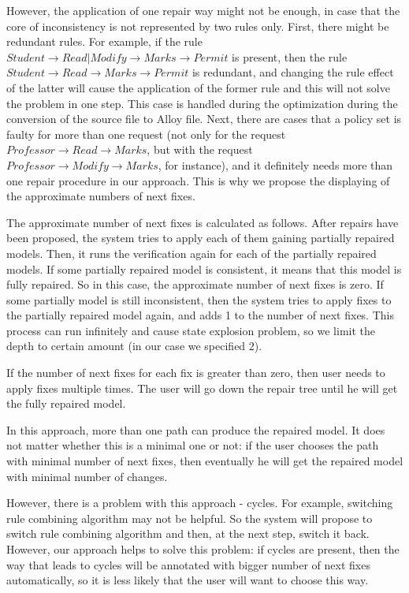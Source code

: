 \documentclass{acm_proc_article-sp}
\begin{document}
However, the application of one repair way might not be enough, in case that the core of inconsistency is not represented by two rules only. First, there might be redundant rules. For example, if the rule $Student \to Read|Modify \to Marks \to Permit$ is present, then the rule $Student \to Read \to Marks \to Permit$ is redundant, and changing the rule effect of the latter will cause the application of the former rule and this will not solve the problem in one step. This case is handled during the optimization during the conversion of the source file to Alloy file. Next, there are cases that a policy set is faulty for more than one request (not only for the request $Professor \to Read \to Marks$, but with the request  $Professor \to  Modify \to Marks$, for instance), and it definitely needs more than one repair procedure in our approach. This is why we propose the displaying of the approximate numbers of next fixes.

The approximate number of next fixes is calculated as follows. After repairs have been proposed, the system tries to apply each of them gaining partially repaired models. Then, it runs the verification again for each of the partially repaired models. If some partially repaired model is consistent, it means that this model is fully repaired. So in this case, the approximate number of next fixes is zero. If some partially model is still inconsistent, then the system tries to apply fixes to the partially repaired model again, and adds 1 to the number of next fixes. This process can run infinitely and cause state explosion problem, so we limit the depth to certain amount (in our case we specified 2).

If the number of next fixes for each fix is greater than zero, then user needs to apply fixes multiple times. The user will go down the repair tree until he will get the fully repaired model.

In this approach, more than one path can produce the repaired model. It does not matter whether this is a minimal one or not: if the user chooses the path with minimal number of next fixes, then eventually he will get the repaired model with minimal number of changes.

However, there is a problem with this approach - cycles. For example, switching rule combining algorithm may not be helpful. So the system will propose to switch rule combining algorithm and then, at the next step, switch it back. However, our approach helps to solve this problem: if cycles are present, then the way that leads to cycles will be annotated with bigger number of next fixes automatically, so it is less likely that the user will want to choose this way.
\end{document}
